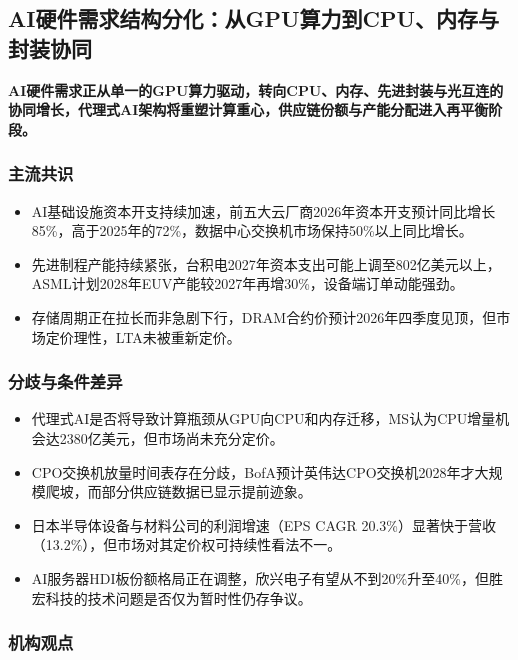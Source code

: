 \documentclass[11pt]{ctexart}
\begin{document}
\subsection{AI硬件需求结构分化：从GPU算力到CPU、内存与封装协同}
\textbf{AI硬件需求正从单一的GPU算力驱动，转向CPU、内存、先进封装与光互连的协同增长，代理式AI架构将重塑计算重心，供应链份额与产能分配进入再平衡阶段。}
\subsubsection*{主流共识}
\begin{itemize}
  \item AI基础设施资本开支持续加速，前五大云厂商2026年资本开支预计同比增长85\%，高于2025年的72\%，数据中心交换机市场保持50\%以上同比增长。
  \item 先进制程产能持续紧张，台积电2027年资本支出可能上调至802亿美元以上，ASML计划2028年EUV产能较2027年再增30\%，设备端订单动能强劲。
  \item 存储周期正在拉长而非急剧下行，DRAM合约价预计2026年四季度见顶，但市场定价理性，LTA未被重新定价。
\end{itemize}
\subsubsection*{分歧与条件差异}
\begin{itemize}
  \item 代理式AI是否将导致计算瓶颈从GPU向CPU和内存迁移，MS认为CPU增量机会达2380亿美元，但市场尚未充分定价。
  \item CPO交换机放量时间表存在分歧，BofA预计英伟达CPO交换机2028年才大规模爬坡，而部分供应链数据已显示提前迹象。
  \item 日本半导体设备与材料公司的利润增速（EPS CAGR 20.3\%）显著快于营收（13.2\%），但市场对其定价权可持续性看法不一。
  \item AI服务器HDI板份额格局正在调整，欣兴电子有望从不到20\%升至40\%，但胜宏科技的技术问题是否仅为暂时性仍存争议。
\end{itemize}
\subsubsection*{机构观点}
\end{document}
